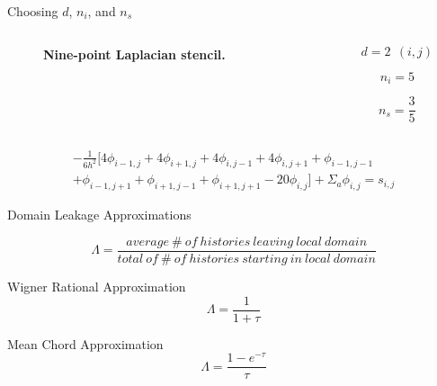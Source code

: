 \documentclass{beamer}
\begin{document}
\begin{frame}{Choosing $d$, $n_i$, and $n_s$}

  \begin{columns}

    \begin{column}{0.5\textwidth}
      \begin{figure}[t!]
        \begin{center}
          \scalebox{0.5}{}
        \end{center}
        \caption{\textbf{Nine-point Laplacian stencil.}}
      \end{figure}
    \end{column}

    \begin{column}{0.5\textwidth}
      \[
      d = 2 \ \ (i,j)
      \]

      \[
      n_i = 5
      \]

      \[
      n_s = \frac{3}{5}
      \]
    \end{column}

  \end{columns}

  \begin{multline}
    -\frac{1}{6h^2}[4 \phi_{i-1,j} + 4 \phi_{i+1,j} + 4 \phi_{i,j-1} + 4
      \phi_{i,j+1} + \phi_{i-1,j-1}\\ + \phi_{i-1,j+1} + \phi_{i+1,j-1}
      + \phi_{i+1,j+1} - 20 \phi_{i,j}] + \Sigma_a \phi_{i,j} = s_{i,j}
  \end{multline}

\end{frame}

\begin{frame}{Domain Leakage Approximations}

  \[
    \Lambda = \frac{average\ \#\ of\ histories\ leaving\ local\ domain}
            {total\ of\ \#\ of\ histories\ starting\ in\ local\ domain}
  \]
  \bigskip

  \begin{beamerboxesrounded}[upper=boxheadcolor,lower=boxbodycolor,shadow=true]
    {Wigner Rational Approximation}
  \[
    \Lambda = \frac{1}{1+\tau}
  \]
  \end{beamerboxesrounded}
  \bigskip

  \begin{beamerboxesrounded}[upper=boxheadcolor,lower=boxbodycolor,shadow=true]
    {Mean Chord Approximation}
  \[
    \Lambda = \frac{1-e^{-\tau}}{\tau}
  \]
  \end{beamerboxesrounded}

\end{frame}
\end{document}
